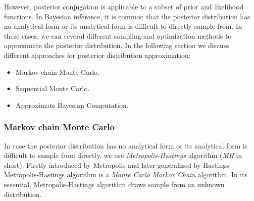 However, posterior conjugation is applicable to a subset of prior and likelihood functions. In
Bayesian inference, it is common that the posterior distribution has no analytical form or its
analytical form is difficult to directly sample from. In these cases, we can several different
sampling and optimization methods to approximate the posterior distribution. In the following
section we discuss different approaches for posterior distribution approximation:
\begin{itemize}
    \item Markov chain Monte Carlo.
    \item Sequential Monte Carlo.
    \item Approximate Bayesian Computation.
\end{itemize}

\subsubsection{Markov chain Monte Carlo}
In case the posterior distribution has no analytical form or its analytical form is difficult to
sample from directly, we use \textit{Metropolis-Hastings} algorithm  (\textit{MH} in short). Firstly
introduced by Metropolis \cite{metropolis1953equation} and later generalized by Hastings
\cite{hastings1970monte} Metropolis-Hastings algorithm is a \textit{Monte Carlo Markov Chain}
algorithm. In its essential, Metropolis-Hastings algorithm draws sample from an unknown
distribution.

